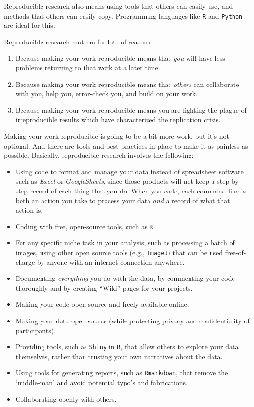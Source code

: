 \documentclass[]{book}
\providecommand{\tightlist}{%
  \setlength{\itemsep}{0pt}\setlength{\parskip}{0pt}}
\begin{document}
Reproducible research also means using tools that others can easily use, and methods that others can easily copy. Programming languages like \texttt{R} and \texttt{Python} are ideal for this.

Reproducible research matters for lots of reasons:

\begin{enumerate}
\def\labelenumi{\arabic{enumi}.}
\tightlist
\item
  Because making your work reproducible means that \emph{you} will have less problems returning to that work at a later time.\\
\item
  Because making your work reproducible means that \emph{others} can collaborate with you, help you, error-check you, and build on your work.\\
\item
  Because making your work reproducible means you are fighting the plague of irreproducible results which have characterized the replication crisis.
\end{enumerate}

Making your work reproducible is going to be a bit more work, but it's not optional. And there are tools and best practices in place to make it as painless as possible. Basically, reproducible research involves the following:

\begin{itemize}
\item
  Using code to format and manage your data instead of spreadsheet software such as \emph{Excel} or \emph{GoogleSheets}, since those products will not keep a step-by-step record of each thing that you do. When you code, each command line is both an action you take to process your data \emph{and} a record of what that action is.
\item
  Coding with free, open-source tools, such as \texttt{R}.
\item
  For any specific niche task in your analysis, such as processing a batch of images, using other open source tools (e.g., \texttt{ImageJ}) that can be used free-of-charge by anyone with an internet connection anywhere.
\item
  Documenting \emph{everything} you do with the data, by commenting your code thoroughly and by creating ``Wiki'' pages for your projects.
\item
  Making your code open source and freely available online.
\item
  Making your data open source (while protecting privacy and confidentiality of participants).
\item
  Providing tools, such as \texttt{Shiny} in \texttt{R}, that allow others to explore your data themselves, rather than trusting your own narratives about the data.
\item
  Using tools for generating reports, such as \texttt{Rmarkdown}, that remove the `middle-man' and avoid potential typo's and fabrications.
\item
  Collaborating openly with others.
\end{itemize}
\end{document}

